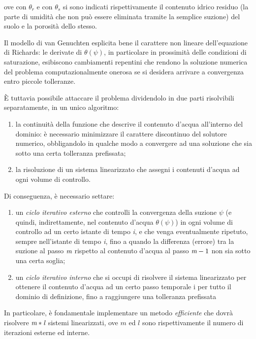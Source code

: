 \documentclass[11pt]{amsart}
\theoremstyle{definition}
\theoremstyle{remark}
\numberwithin{equation}{section}
\begin{document}
ove con $\theta_{r}$ e con $\theta_s$ si sono indicati rispettivamente il contenuto idrico residuo (la parte di umidità che non può essere eliminata tramite la semplice suzione) del suolo e la porosità dello stesso. 


Il modello di van Genuchten esplicita bene il carattere non lineare dell'equazione di Richards: le derivate di $\theta(\psi)$, in particolare in prossimità delle condizioni di saturazione, esibiscono cambiamenti repentini che rendono la soluzione numerica del problema computazionalmente onerosa se si desidera arrivare a convergenza entro piccole tolleranze. 

È tuttavia possibile attaccare il problema dividendolo in due parti risolvibili separatamente, in un unico algoritmo:
\begin{enumerate}
 \item la continuità della funzione che descrive il contenuto d'acqua all'interno del dominio: è necessario minimizzare il carattere discontinuo del solutore numerico, obbligandolo in qualche modo a convergere ad una soluzione che sia sotto una certa tolleranza prefissata;
 \item la risoluzione di un sistema linearizzato che assegni i contenuti d'acqua ad ogni volume di controllo.
\end{enumerate}


Di conseguenza, è necessario settare: 


\begin{enumerate}
 \item un \emph{ciclo iterativo esterno} che controlli la convergenza della suzione $\psi$ (e quindi, indirettamente, nel contenuto d'acqua $\theta(\psi)$) in ogni volume di controllo ad un certo istante di tempo \emph{i}, e che venga eventualmente ripetuto, sempre nell'istante di tempo \emph{i}, fino a quando la differenza (errore) tra la suzione al passo $\emph{m}$ rispetto al contenuto d'acqua al passo $\emph{m}-1$ non sia sotto una certa soglia;
 \item un \emph{ciclo iterativo interno} che si occupi di risolvere il sistema linearizzato per ottenere il contenuto d'acqua ad un certo passo temporale {i} per tutto il dominio di definizione, fino a raggiungere una tolleranza prefissata       
\end{enumerate}

In particolare, è fondamentale implementare un metodo \emph{efficiente} che dovrà risolvere $\emph{m}*\emph{l}$ sistemi linearizzati, ove $m$ ed $l$ sono rispettivamente il numero di iterazioni esterne ed interne.
\end{document}
